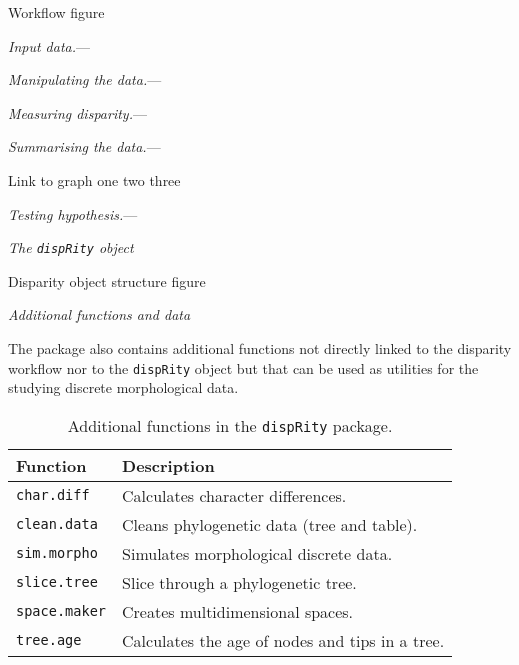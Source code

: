 \documentclass[12pt,letterpaper]{article}
\renewcommand{\subsection}[1]{%
\bigskip
\begin{center}
\begin{large}
\normalfont\itshape #1
\end{large}
\end{center}}
\renewcommand{\subsubsection}[1]{%
\vspace{2ex}
\noindent
\textit{#1.}---}
\begin{document}
Workflow figure

\subsubsection{Input data}

\subsubsection{Manipulating the data}

\subsubsection{Measuring disparity}

\subsubsection{Summarising the data}

Link to graph one two three

\subsubsection{Testing hypothesis}

\subsection{The \texttt{dispRity} object}

Disparity object structure figure

\subsection{Additional functions and data}

The package also contains additional functions not directly linked to the disparity workflow nor to the \texttt{dispRity} object but that can be used as utilities for the studying discrete morphological data.

\begin{table}
    \begin{tabular}{ll}
        \hline
        Function & Description \\ 
        \hline
        \texttt{char.diff} & Calculates character differences. \\
        \texttt{clean.data} & Cleans phylogenetic data (tree and table). \\
        \texttt{sim.morpho} & Simulates morphological discrete data. \\
        \texttt{slice.tree} & Slice through a phylogenetic tree. \\
        \texttt{space.maker} & Creates multidimensional spaces. \\
        \texttt{tree.age} & Calculates the age of nodes and tips in a tree. \\
        \hline
    \end{tabular}
    \caption{Additional functions in the \texttt{dispRity} package.}
\end{table}
\end{document}
